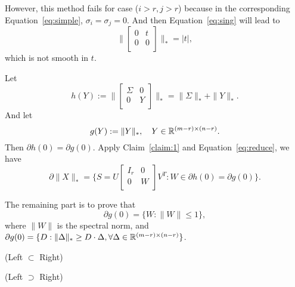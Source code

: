 However,
this method fails for case ($i>r, j>r$)
because in the corresponding Equation~\eqref{eq:simple},
$\sigma_i=\sigma_j=0$.
And then Equation~\eqref{eq:sing} will lead to
\begin{equation}
    \bigg\|\begin{bmatrix}
        0 & t \\
        0 & 0 \\
    \end{bmatrix}\bigg\|_*=|t|,
\end{equation}
which is not smooth in $t$.

Let
\begin{equation}
    h(Y):=\bigg\|\begin{bmatrix}
            \Sigma & 0 \\
            0      & Y \\
        \end{bmatrix}\bigg\|_*
        =\|\Sigma\|_*+\|Y\|_*.
\end{equation}
And let
\begin{equation}
    g(Y):=\|Y\|_*,\quad Y\in{\mathbb{R}}^{(m-r)\times(n-r)}.
\end{equation}
Then $\partial h(0)=\partial g(0)$.
Apply Claim~\ref{claim:1} and Equation~\eqref{eq:reduce},
we have
\begin{equation}
    \partial \|X\|_*=\bigg\{
        S=U\begin{bmatrix}
            I_r & 0 \\
            0   & W \\
        \end{bmatrix}V^T:W\in\partial h(0)=\partial g(0)
        \bigg\}.
\end{equation}

The remaining part is to prove that
\begin{equation}
    \partial g(0)=\{W:\|W\|\le1\},
\end{equation}
where $\|W\|$ is the spectral norm, and
$\partial g(0)=\{D:\|\Delta\|_*\ge D\cdot\Delta,
\forall\Delta\in{\mathbb{R}}^{(m-r)\times(n-r)}\}$.

(Left $\subset$ Right)

(Left $\supset$ Right)
